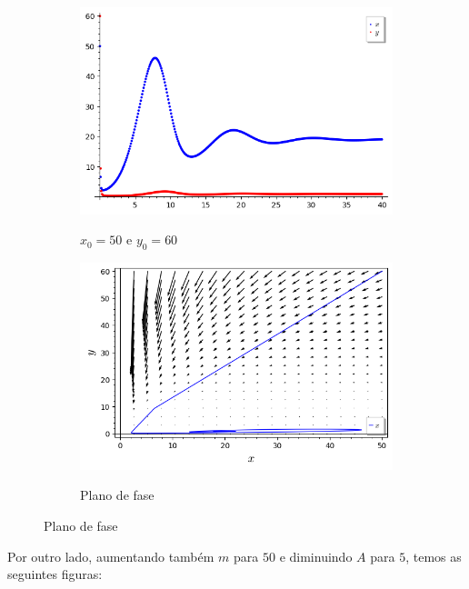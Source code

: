 \begin{figure}[H]
    \centering
    \begin{subfigure}{0.4\textwidth}
        \includegraphics[scale=0.48]{figuras/HT_11.png}
        \label{fig:HT_11}
        \caption{$x_0 = 50$ e $y_0 = 60$}
    \end{subfigure}
    \begin{subfigure}{0.4\textwidth}
        \includegraphics[scale=0.48]{figuras/HT_12.png}
        \label{fig:HT_12}
        \caption{Plano de fase}
    \end{subfigure}
\end{figure}

Por outro lado, aumentando também $m$ para $50$ e diminuindo $A$ para $5$, temos as seguintes figuras:

